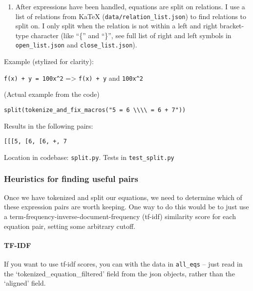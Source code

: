 \documentclass[]{article}
\providecommand{\tightlist}{%
  \setlength{\itemsep}{0pt}\setlength{\parskip}{0pt}}
\let\oldparagraph\paragraph
\renewcommand{\paragraph}[1]{\oldparagraph{#1}\mbox{}}
\begin{document}
\begin{enumerate}
\def\labelenumi{\arabic{enumi}.}
\setcounter{enumi}{1}
\tightlist
\item
  After expressions have been handled, equations are split on relations.
  I use a list of relations from KaTeX
  (\texttt{data/relation\_list.json}) to find relations to split on. I
  only split when the relation is not within a left and right
  bracket-type character (like ``\{'' and ``\}'', see full list of right
  and left symbols in \texttt{open\_list.json} and
  \texttt{close\_list.json}).
\end{enumerate}

Example (stylized for clarity):

\texttt{f(x)\ +\ y\ =\ 100x\^{}2} =\textgreater{} \texttt{f(x)\ +\ y}
and \texttt{100x\^{}2}

(Actual example from the code)

\texttt{split(tokenize\_and\_fix\_macros("5\ =\ 6\ \textbackslash{}\textbackslash{}\textbackslash{}\textbackslash{}\ =\ 6\ +\ 7"))}

Results in the following pairs:

\texttt{{[}{[}{[}\textquotesingle{}5\textquotesingle{}{]},\ {[}\textquotesingle{}6\textquotesingle{}{]},\ {[}\textquotesingle{}6\textquotesingle{},\ \textquotesingle{}+\textquotesingle{},\ \textquotesingle{}7\textquotesingle{}{]}{]}{]}}

Location in codebase: \texttt{split.py}. Tests in
\texttt{test\_split.py}

\hypertarget{heuristics-for-finding-useful-pairs}{%
\subsubsection{Heuristics for finding useful
pairs}\label{heuristics-for-finding-useful-pairs}}

Once we have tokenized and split our equations, we need to determine
which of these expression pairs are worth keeping. One way to do this
would be to just use a term-frequency-inverse-document-frequency
(tf-idf) similarity score for each equation pair, setting some arbitrary
cutoff.

\hypertarget{tf-idf}{%
\paragraph{TF-IDF}\label{tf-idf}}

If you want to use tf-idf scores, you can with the data in
\texttt{all\_eqs} -- just read in the `tokenized\_equation\_filtered'
field from the json objects, rather than the `aligned' field.
\end{document}

